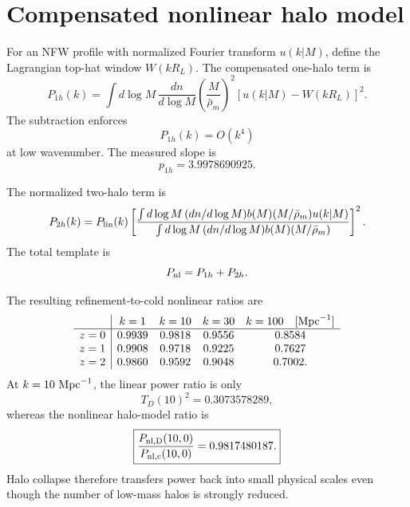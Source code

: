 \section{Compensated nonlinear halo model}

For an NFW profile with normalized Fourier transform $u(k|M)$, define the Lagrangian top-hat window $W(kR_L)$.  The compensated one-halo term is
\begin{equation}
 P_{1h}(k)
 =\int d\log M\,
 \frac{dn}{d\log M}
 \left(\frac{M}{\bar\rho_m}\right)^2
 \left[u(k|M)-W(kR_L)\right]^2.
 \label{eq:nlh-one-halo}
\end{equation}
The subtraction enforces
\begin{equation}
 P_{1h}(k)=O(k^4)
 \label{eq:nlh-one-halo-k4}
\end{equation}
at low wavenumber.  The measured slope is
\begin{equation}
 \boxed{p_{1h}=3.9978690925.}
 \label{eq:nlh-one-halo-slope}
\end{equation}

The normalized two-halo term is
\begin{equation}
 P_{2h}(k)
 =P_{\rm lin}(k)
 \left[
 \frac{
 \int d\log M\,(dn/d\log M)b(M)(M/\bar\rho_m)u(k|M)
 }{
 \int d\log M\,(dn/d\log M)b(M)(M/\bar\rho_m)
 }
 \right]^2.
 \label{eq:nlh-two-halo}
\end{equation}
The total template is
\begin{equation}
 P_{\rm nl}=P_{1h}+P_{2h}.
 \label{eq:nlh-total-power}
\end{equation}

The resulting refinement-to-cold nonlinear ratios are
\begin{equation}
 \begin{array}{c|cccc}
 &k=1&k=10&k=30&k=100\quad [{\rm Mpc}^{-1}]\\
 \hline
 z=0&0.9939&0.9818&0.9556&0.8584\\
 z=1&0.9908&0.9718&0.9225&0.7627\\
 z=2&0.9860&0.9592&0.9048&0.7002.
 \end{array}
 \label{eq:nlh-power-ratios}
\end{equation}
At $k=10\ {\rm Mpc}^{-1}$, the linear power ratio is only
\begin{equation}
 T_D(10)^2=0.3073578289,
 \label{eq:nlh-linear-k10}
\end{equation}
whereas the nonlinear halo-model ratio is
\begin{equation}
 \boxed{
 \frac{P_{\rm nl,D}(10,0)}{P_{\rm nl,c}(10,0)}
 =0.9817480187.
 }
 \label{eq:nlh-nonlinear-k10}
\end{equation}
Halo collapse therefore transfers power back into small physical scales even though the number of low-mass halos is strongly reduced.

